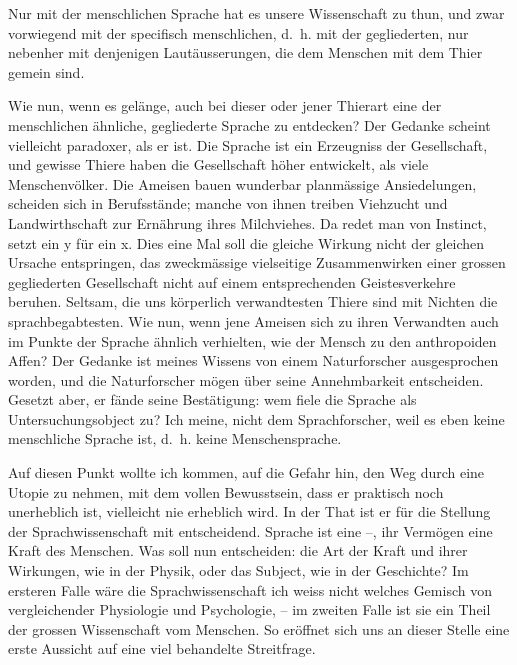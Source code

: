Nur mit der menschlichen Sprache hat es unsere Wissenschaft zu thun, und zwar vorwiegend mit der specifisch menschlichen, d.~h. mit der gegliederten, nur nebenher mit denjenigen Lautäusserungen, die dem Menschen mit dem Thier gemein sind.

Wie nun, wenn es gelänge, auch bei dieser oder jener Thierart eine der menschlichen ähnliche, gegliederte Sprache zu entdecken? Der Gedanke scheint vielleicht paradoxer, als er ist. Die Sprache ist ein Erzeugniss der Gesellschaft, \label{sp.4} und gewisse Thiere haben die Gesellschaft höher entwickelt, als viele Menschenvölker. Die Ameisen bauen wunderbar planmässige Ansiedelungen, scheiden sich in Berufsstände; manche von ihnen treiben Viehzucht und Landwirthschaft zur Ernährung ihres Milchviehes. Da redet man von Instinct, setzt ein y für ein x. Dies eine Mal soll die gleiche Wirkung nicht der gleichen Ursache entspringen, das zweckmässige vielseitige Zusammenwirken einer grossen gegliederten Gesellschaft nicht auf einem entsprechenden Geistesverkehre beruhen. Seltsam, die uns körperlich verwandtesten Thiere sind mit Nichten die sprachbegabtesten. Wie nun, wenn jene Ameisen sich zu ihren Verwandten auch im Punkte der Sprache ähnlich verhielten, wie der Mensch zu den anthropoiden Affen? Der Gedanke ist meines Wissens von einem Naturforscher ausgesprochen worden, und die Naturforscher mögen über seine Annehmbarkeit entscheiden. Gesetzt aber, er fände seine Bestätigung: wem fiele die Sprache als Untersuchungsobject zu? Ich meine, nicht dem Sprachforscher, weil es eben keine menschliche Sprache ist, d.~h. keine Menschensprache.

Auf diesen Punkt wollte ich kommen, auf die Gefahr hin, den Weg durch eine Utopie zu nehmen, mit dem vollen Bewusstsein, dass er praktisch noch unerheblich ist, vielleicht nie erheblich wird. In der That ist er für die Stellung der Sprachwissenschaft mit entscheidend. Sprache ist eine  –, ihr Vermögen eine Kraft des Menschen. \label{fp.5} Was soll nun entscheiden: die Art der Kraft und ihrer Wirkungen, wie in der Physik, oder das Subject, wie in der Geschichte? Im ersteren Falle wäre die Sprachwissenschaft ich weiss nicht welches Gemisch von vergleichender Physiologie und Psychologie, – im zweiten Falle ist sie ein Theil der grossen Wissenschaft vom Menschen. So eröffnet sich uns an dieser Stelle eine erste Aussicht auf eine viel behandelte Streitfrage.

